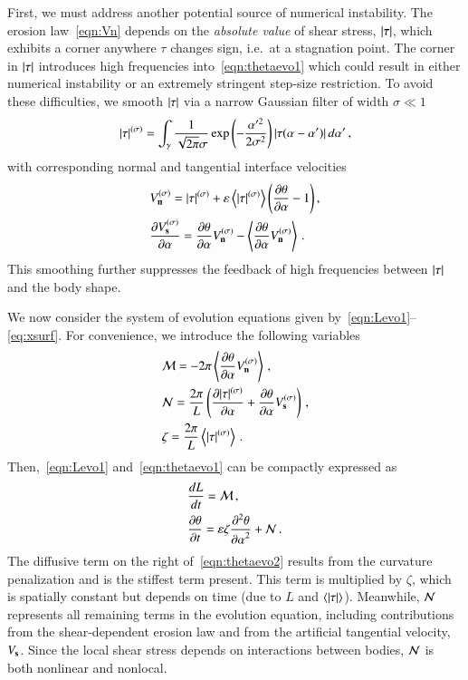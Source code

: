 \documentclass[preprint, 10pt]{elsarticle}
\begin{document}
First, we must address another potential source of numerical instability. The erosion law~\eqref{eqn:Vn} depends on the {\em absolute value} of shear stress, $\lvert \tau \rvert$, which exhibits a corner anywhere $\tau$ changes sign, i.e.~at a stagnation point. The corner in $\lvert \tau \rvert$ introduces high frequencies into~\eqref{eqn:thetaevo1} which could result in either numerical instability or an extremely stringent step-size restriction. To avoid these difficulties, we smooth $\lvert \tau \rvert$ via a narrow Gaussian filter of width $\sigma \ll 1$
\begin{align}
\lvert \tau \rvert^{(\sigma)} = \int_{\gamma} \frac{1}{\sqrt{2\pi} \sigma}
 \exp \left(- \frac{\alpha'^2}{2 \sigma^2}\right) \lvert  \tau(\alpha - \alpha')  \rvert \, d\alpha' \, ,
\end{align}
with corresponding normal and tangential interface velocities
\begin{align}
& V_{\mathbf{n}}^{(\sigma)} = \lvert \tau \rvert^{(\sigma)} +  \varepsilon \left< \lvert \tau \rvert^{(\sigma)} \right>
\left(\frac{\partial \theta}{\partial \alpha} - 1 \right), \\
& \frac{\partial V_{\mathbf{s}}^{(\sigma)}}{\partial \alpha} = \frac{\partial \theta}{\partial \alpha} V_{\mathbf{n}}^{(\sigma)} - \left< \frac{\partial \theta}{\partial \alpha} V_{\mathbf{n}}^{(\sigma)} \right> \, .
\end{align}
This smoothing further suppresses the feedback of high frequencies between $\lvert \tau \rvert$ and the body shape.

We now consider the system of evolution equations given by~\eqref{eqn:Levo1}--\eqref{eq:xsurf}. For convenience, we introduce the following variables
\begin{align}
& \mathcal{M} = - 2 \pi \left< \frac{\partial \theta}{\partial \alpha} V_{\mathbf{n}}^{(\sigma)} \right> \, , \\
& \mathcal{N} = \frac{2 \pi}{L} \left( \frac{\partial \lvert \tau \rvert^{(\sigma)}}{\partial \alpha} + \frac{\partial \theta}{\partial \alpha}
V_{\mathbf{s}}^{(\sigma)} \right) \, , \\
& \zeta = \frac{2 \pi}{L}  \left< \lvert \tau \rvert^{(\sigma)} \right> \, .
\end{align}
Then,~\eqref{eqn:Levo1} and~\eqref{eqn:thetaevo1} can be compactly expressed as
\begin{align}
\label{eqn:Levo2}
& \frac{d L}{d t} = \mathcal{M} \, , \\
\label{eqn:thetaevo2}
& \frac{\partial \theta}{\partial t} = \varepsilon \zeta \frac{\partial^2 \theta}{{\partial \alpha}^2} + \mathcal{N} \,.
\end{align}
The diffusive term on the right of~\eqref{eqn:thetaevo2} results from the curvature penalization and is the stiffest term present. This term is multiplied by $\zeta$, which is spatially constant but depends on time (due to $L$ and $\left< \lvert \tau \rvert \right>$). Meanwhile, $\mathcal{N}$ represents all remaining terms in the evolution equation, including contributions from the shear-dependent erosion law and from the artificial tangential velocity, $V_{\mathbf{s}}$. Since the local shear stress depends on interactions between bodies, $\mathcal{N}$ is both nonlinear and nonlocal.
\end{document}
